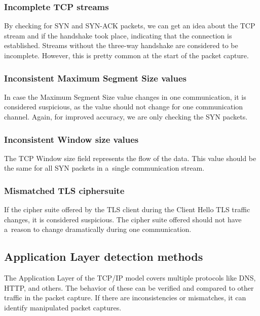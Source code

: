 \documentclass[
  printed,     %
  color,       %
  oneside,     %
  nosansbold,  %
  nocolorbold, %
  nolof,         %
  nolot,         %
]{fithesis4}
\begin{document}
\subsubsection{Incomplete TCP streams}

By checking for SYN and SYN-ACK packets, we can get an idea about the TCP stream and if the handshake took place, indicating that the connection is established. Streams without the three-way handshake are considered to be incomplete. However, this is pretty common at the start of the packet capture.

\subsubsection{Inconsistent Maximum Segment Size values}

In case the Maximum Segment Size value changes in one communication, it is considered suspicious, as the value should not change for one communication channel. Again, for improved accuracy, we are only checking the SYN packets.

\subsubsection{Inconsistent Window size values}

The TCP Window size field represents the flow of the data. This value should be the same for all SYN packets in a~single communication stream.

\subsubsection{Mismatched TLS ciphersuite}

If the cipher suite offered by the TLS client during the Client Hello TLS traffic changes, it is considered suspicious. The cipher suite offered should not have a~reason to change dramatically during one communication.


\subsection{Application Layer detection methods}

The Application Layer of the TCP/IP model covers multiple protocols like DNS, HTTP, and others. The behavior of these can be verified and compared to other traffic in the packet capture. If there are inconsistencies or mismatches, it can identify manipulated packet captures.
\end{document}

